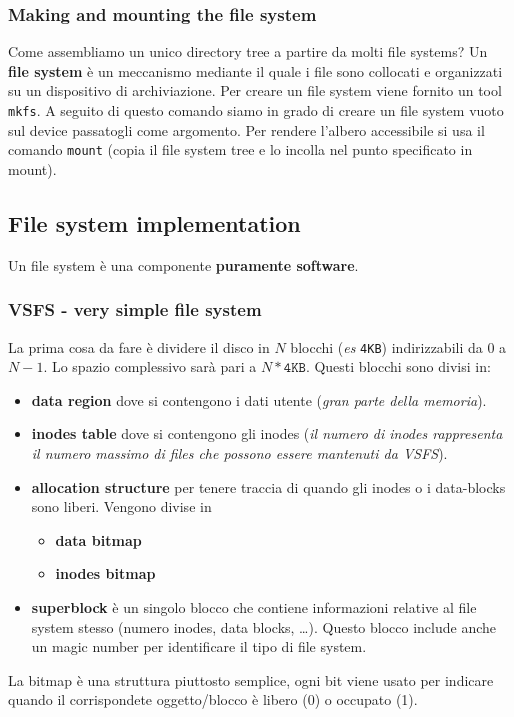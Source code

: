 \documentclass[12pt, twoside, letterpaper]{article}
\begin{document}
			\subsubsection{Making and mounting the file system}
				Come assembliamo un unico directory tree a partire da molti file systems? Un \textbf{file system} è un meccanismo mediante il quale i file sono collocati e organizzati su un dispositivo di archiviazione. Per creare un file system viene fornito un tool \texttt{mkfs}. A seguito di questo comando siamo in grado di creare un file system vuoto sul device passatogli come argomento. Per rendere l'albero accessibile si usa il comando \texttt{mount} (copia il file system tree e lo incolla nel punto specificato in mount).  
				 
		\subsection{File system implementation}
			Un file system è una componente \textbf{puramente software}.
			
			\subsubsection{VSFS - very simple file system}
				La prima cosa da fare è dividere il disco in $N$ blocchi (\textit{es} \texttt{4KB}) indirizzabili da $0$ a $N-1$. Lo spazio complessivo sarà pari a $N * \texttt{4KB}$. Questi blocchi sono divisi in:
				\begin{itemize}
					\item \textbf{data region} dove si contengono i dati utente (\textit{gran parte della memoria}).
					\item \textbf{inodes table} dove si contengono gli inodes (\textit{il numero di inodes rappresenta il numero massimo di files che possono essere mantenuti da VSFS}).
					\item \textbf{allocation structure} per tenere traccia di quando gli inodes o i data-blocks sono liberi. Vengono divise in
					\begin{itemize}
						\item \textbf{data bitmap}
						\item \textbf{inodes bitmap}
					\end{itemize}
					\item \textbf{superblock} è un singolo blocco che contiene informazioni relative al file system stesso (numero inodes, data blocks, \dots). Questo blocco include anche un magic number per identificare il tipo di file system.
				\end{itemize}				
				La bitmap è una struttura piuttosto semplice, ogni bit viene usato per indicare quando il corrispondete oggetto/blocco è libero (0) o occupato (1).
				
\end{document}
